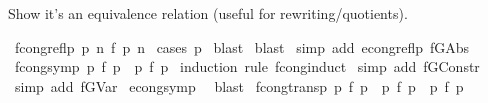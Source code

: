 \begin{isabellebody}
\endisatagproof
{\isafoldproof}%
%
\isadelimproof
%
\endisadelimproof
%
\begin{isamarkuptext}%
Show it's an equivalence relation (useful for rewriting/quotients).%
\end{isamarkuptext}\isamarkuptrue%
\isamarkupfalse%
\ fcong{\isacharunderscore}{\kern0pt}reflp{\isacharcolon}{\kern0pt}\ {\isachardoublequoteopen}{\isacharparenleft}{\kern0pt}p{\isacharcomma}{\kern0pt}\ n{\isacharparenright}{\kern0pt}\ {\isasymsimeq}f\ {\isacharparenleft}{\kern0pt}p{\isacharcomma}{\kern0pt}\ n{\isacharparenright}{\kern0pt}{\isachardoublequoteclose}\isanewline
%
\isadelimproof
%
\endisadelimproof
%
\isatagproof
{}\isamarkupfalse%
\ {\isacharparenleft}{\kern0pt}cases\ p{\isacharparenright}{\kern0pt}\isanewline
{}\isamarkupfalse%
\ blast\isanewline
{}\isamarkupfalse%
\ blast\isanewline
{}\isamarkupfalse%
\ {\isacharparenleft}{\kern0pt}simp\ add{\isacharcolon}{\kern0pt}\ econg{\isacharunderscore}{\kern0pt}reflp\ f{\isacharunderscore}{\kern0pt}GAbs{\isacharparenright}{\kern0pt}%
\endisatagproof
{\isafoldproof}%
%
\isadelimproof
\isanewline
%
\endisadelimproof
\isanewline
{}\isamarkupfalse%
\ fcong{\isacharunderscore}{\kern0pt}symp{\isacharcolon}{\kern0pt}\ {\isachardoublequoteopen}p{}\ {\isasymsimeq}f\ p{}\ {\isacharequal}{\kern0pt}{\isacharequal}{\kern0pt}{\isachargreater}{\kern0pt}\ p{}\ {\isasymsimeq}f\ p{}{\isachardoublequoteclose}\isanewline
%
\isadelimproof
%
\endisadelimproof
%
\isatagproof
{}\isamarkupfalse%
\ {\isacharparenleft}{\kern0pt}induction\ rule{\isacharcolon}{\kern0pt}\ fcong{\isachardot}{\kern0pt}induct{\isacharparenright}{\kern0pt}\isanewline
{}\isamarkupfalse%
\ {\isacharparenleft}{\kern0pt}simp\ add{\isacharcolon}{\kern0pt}\ f{\isacharunderscore}{\kern0pt}GConstr{\isacharparenright}{\kern0pt}\isanewline
{}\isamarkupfalse%
\ {\isacharparenleft}{\kern0pt}simp\ add{\isacharcolon}{\kern0pt}\ f{\isacharunderscore}{\kern0pt}GVar{\isacharparenright}{\kern0pt}\isanewline
{}\isamarkupfalse%
\ econg{\isacharunderscore}{\kern0pt}symp\ \isamarkupfalse%
\ blast%
\endisatagproof
{\isafoldproof}%
%
\isadelimproof
\isanewline
%
\endisadelimproof
\isanewline
{}\isamarkupfalse%
\ fcong{\isacharunderscore}{\kern0pt}transp{\isacharcolon}{\kern0pt}\ {\isachardoublequoteopen}p{}\ {\isasymsimeq}f\ p{}\ {\isacharequal}{\kern0pt}{\isacharequal}{\kern0pt}{\isachargreater}{\kern0pt}\ p{}\ {\isasymsimeq}f\ p{}\ {\isacharequal}{\kern0pt}{\isacharequal}{\kern0pt}{\isachargreater}{\kern0pt}\ p{}\ {\isasymsimeq}f\ p{}{\isachardoublequoteclose}\isanewline

\end{isabellebody}
